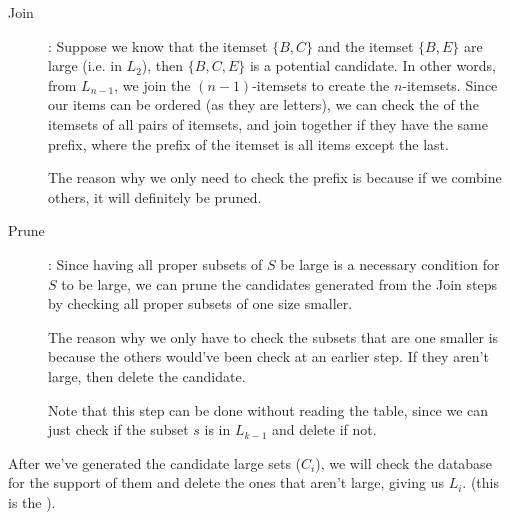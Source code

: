 \documentclass[../main/main.tex]{subfiles}
\begin{document}
\begin{description}
	\item[Join]:
		Suppose we know that the itemset $\{B,C\}$ and the itemset $\{B,E\}$ are large (i.e. in $L_2$), then $\{B,C,E\} $ is a potential candidate. In other words, from $L_{n-1}$, we join the $(n-1)$-itemsets to create the $n$-itemsets. Since our items can be ordered (as they are letters), we can check the  of the itemsets of all pairs of itemsets, and join together if they have the same prefix, where the prefix of the itemset is all items except the last.
		\begin{remark}
			The reason why we only need to check the prefix is because if we combine others, it will definitely be pruned.
		\end{remark}
\item[Prune]:
	Since having all proper subsets of $S$ be large is a necessary condition for $S$ to be large, we can prune the candidates generated from the Join steps by checking all proper subsets of one size smaller.
	\begin{remark}
		The reason why we only have to check the subsets that are one smaller is because the others would've been check at an earlier step. If they aren't large, then delete the candidate.
	\end{remark}
	\begin{remark}
		Note that this step can be done without reading the table, since we can just check if the subset $s$ is in $L_{k-1}$ and delete if not.
	\end{remark}
\end{description}
After we've generated the candidate large sets ($C_i$), we will check the database for the support of them and delete the ones that aren't large, giving us $L_i$. (this is the ).
\end{document}
